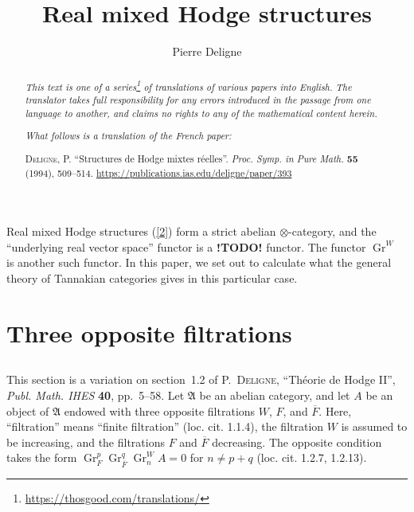 \documentclass{article}
\title{Real mixed Hodge structures}
\author{Pierre Deligne}
\date{}
\theoremstyle{plain}
\DeclareMathOperator{\Gr}{Gr}
\newcommand{\todo}{\textbf{ !TODO! }}
\newcommand{\oldpage}[1]{\marginpar{\footnotesize$\Big\vert$ \textit{p.~#1}}}
\begin{document}
\maketitle
\thispagestyle{fancy}

\renewcommand{\abstractname}{Translator's note.}

\begin{abstract}
  \renewcommand*{\thefootnote}{\fnsymbol{footnote}}
  \emph{This text is one of a series\footnote{\url{https://thosgood.com/translations/}} of translations of various papers into English.}
  \emph{The translator takes full responsibility for any errors introduced in the passage from one language to another, and claims no rights to any of the mathematical content herein.}
  
  \emph{What follows is a translation of the French paper:}

  \medskip\noindent
  \textsc{Deligne, P.}
  ``Structures de Hodge mixtes r\'{e}elles''.
  \emph{Proc. Symp. in Pure Math.} \textbf{55} (1994), 509--514.
  {\footnotesize\url{https://publications.ias.edu/deligne/paper/393}}
\end{abstract}

\setcounter{footnote}{0}

\tableofcontents
\bigskip



\oldpage{509}
Real mixed Hodge structures (\cref{2}) form a strict abelian $\otimes$-category, and the ``underlying real vector space'' functor is a \todo functor.
The functor $\Gr^W$ is another such functor.
In this paper, we set out to calculate what the general theory of Tannakian categories gives in this particular case.


\section{Three opposite filtrations}
\label{1}

\subsection{}
\label{1.1}

This section is a variation on section~1.2 of \textsc{P.~Deligne}, ``Th\'{e}orie de Hodge II'', \emph{Publ. Math. IHES} \textbf{40}, pp.~5--58.
Let $\mathfrak{A}$ be an abelian category, and let $A$ be an object of $\mathfrak{A}$ endowed with three opposite filtrations $W$, $F$, and $\overline{F}$.
Here, ``filtration'' means ``finite filtration'' (loc. cit. 1.1.4), the filtration $W$ is assumed to be increasing, and the filtrations $F$ and $\overline{F}$ decreasing.
The opposite condition takes the form $\Gr_F^p\Gr_{\overline{F}}^q\Gr_n^WA=0$ for $n\neq p+q$ (loc. cit. 1.2.7, 1.2.13).
\end{document}
